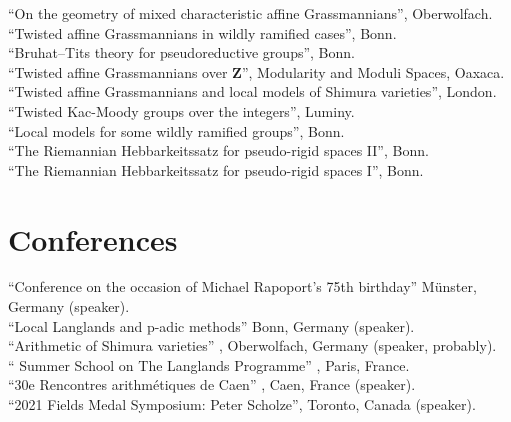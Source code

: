 \documentclass[12pt]{article} %
\begin{document}
 ``On the geometry of mixed characteristic affine Grassmannians'', Oberwolfach.
\\

``Twisted affine Grassmannians in wildly ramified cases'', Bonn.
\\

``Bruhat--Tits theory for pseudoreductive groups'', Bonn.
\\

 ``Twisted affine Grassmannians over $\mathbf{Z}$'', Modularity and Moduli Spaces, Oaxaca. 
\\

 ``Twisted affine Grassmannians and local models of Shimura varieties'', London.
\\

 ``Twisted Kac-Moody groups over the integers'', Luminy. 
\\

 ``Local models for some wildly ramified groups'', Bonn.  
\\

 ``The Riemannian Hebbarkeitssatz for pseudo-rigid spaces II'', Bonn.  
\\

 ``The Riemannian Hebbarkeitssatz for pseudo-rigid spaces I'', Bonn.  	 

\section*{Conferences}

``Conference on the occasion of Michael Rapoport's 75th birthday''  Münster, Germany (speaker).\\

``Local Langlands and p-adic methods''  Bonn, Germany (speaker).\\

``Arithmetic of Shimura varieties'' , Oberwolfach, Germany (speaker, probably). \\

`` Summer School on The Langlands Programme'' , Paris, France. \\

``30e Rencontres arithmétiques de Caen'' , Caen, France (speaker). \\

``2021 Fields Medal Symposium: Peter Scholze'',  Toronto, Canada (speaker). \\
\end{document}
